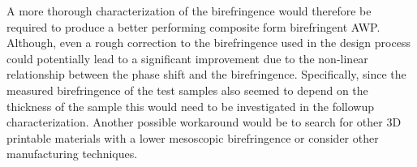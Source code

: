 A more thorough characterization of the birefringence would therefore be required to produce a better performing composite form birefringent AWP. Although, even a rough correction to the birefringence used in the design process could potentially lead to a significant improvement due to the non-linear relationship between the phase shift and the birefringence. Specifically, since the measured birefringence of the test samples also seemed to depend on the thickness of the sample this would need to be investigated in the followup characterization. Another possible workaround would be to search for other 3D printable materials with a lower mesoscopic birefringence or consider other manufacturing techniques. 



